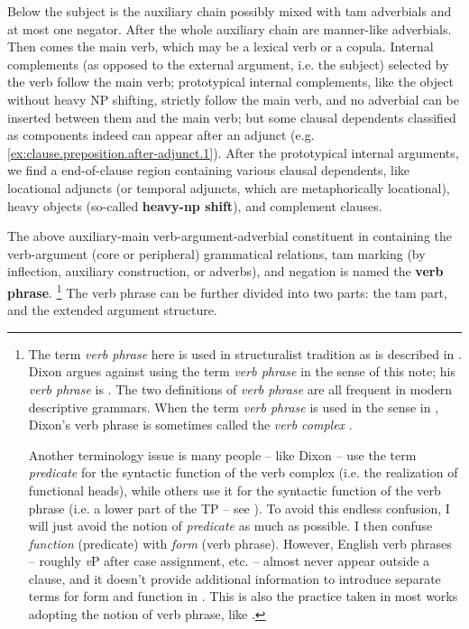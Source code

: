 \documentclass[UTF8, a4paper, oneside, scheme=plain, 12pt]{ctexbook}
\newcommand*{\concept}[1]{\textbf{#1}}
\newcommand*{\term}[1]{\emph{#1}}
\newcommand{\vP}{\textit{v}P}
\begin{document}
Below the subject is the auxiliary chain 
possibly mixed with \acs{tam} adverbials and at most one negator.
After the whole auxiliary chain are manner-like adverbials.
Then comes the main verb, which may be a lexical verb or a copula.
Internal complements (as opposed to the external argument, i.e. the subject) 
selected by the verb follow the main verb; 
prototypical internal complements, like the object without heavy NP shifting, 
strictly follow the main verb, 
and no adverbial can be inserted between them and the main verb; 
but some clausal dependents classified as components indeed can appear after an adjunct
(e.g. \ref{ex:clause.preposition.after-adjunct.1}).
After the prototypical internal arguments, 
we find a end-of-clause region containing various clausal dependents,
like locational adjuncts (or temporal adjuncts, which are metaphorically locational), 
heavy objects (so-called \concept{heavy-\acs{np} shift}), and complement clauses.

The above auxiliary-main verb-argument-adverbial constituent in  
containing the verb-argument (core or peripheral) grammatical relations,
\ac{tam} marking (by inflection, auxiliary construction, or adverbs), and negation
is named the \concept{verb phrase}.%
\footnote{
    The term \term{verb phrase} here 
    is used in structuralist tradition as is described in \citet{cgel}.
    Dixon argues against using the term \term{verb phrase} in the sense of this note;
    his \term{verb phrase} is .
    The two definitions of \term{verb phrase} are all frequent in modern descriptive grammars.
    When the term \term{verb phrase} is used in the sense in ,
    Dixon's verb phrase is sometimes called the \term{verb complex} \citep{Friesen2017}.

    Another terminology issue is many people -- like Dixon -- use the term \term{predicate}
    for the syntactic function of the verb complex
    (i.e. the realization of functional heads),
    while others use it for the syntactic function of the verb phrase 
    (i.e. a lower part of the TP -- see ).
    To avoid this endless confusion, 
    I will just avoid the notion of \term{predicate} as much as possible.
    I then confuse \emph{function} (predicate)
    with \emph{form} (verb phrase).
    However, English verb phrases -- roughly \vP{} after case assignment, etc. -- 
    almost never appear outside a clause,
    and it doesn't provide additional information 
    to introduce separate terms for form and function in .
    This is also the practice taken in most works adopting the notion of verb phrase,
    like \citet{Friesen2017}.
}
The verb phrase can be further divided into two parts: 
the \acs{tam} part, 
and the extended argument structure.
\end{document}
